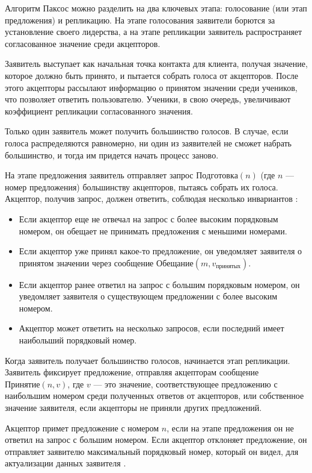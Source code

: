 Алгоритм Паксос можно разделить на два ключевых этапа: голосование (или этап
предложения) и репликацию. На этапе голосования заявители борются за установление
своего лидерства, а на этапе репликации заявитель распространяет согласованное
значение среди акцепторов.

Заявитель выступает как начальная точка контакта для клиента, получая значение,
которое должно быть принято, и пытается собрать голоса от акцепторов. После
этого акцепторы рассылают информацию о принятом значении среди учеников, что
позволяет ответить пользователю. Ученики, в свою очередь, увеличивают
коэффициент репликации согласованного значения.

Только один заявитель может получить большинство голосов. В случае, если
голоса распределяются равномерно, ни один из заявителей не сможет набрать
большинство, и тогда им придется начать процесс заново.

На этапе предложения заявитель отправляет запрос $Подготовка(n)$ (где $n$ —
номер предложения) большинству акцепторов, пытаясь собрать их голоса. Акцептор,
получив запрос, должен ответить, соблюдая несколько инвариантов \cite{lamport01}:

\begin{itemize}
    \item Если акцептор еще не отвечал на запрос с более высоким порядковым
        номером, он обещает не принимать предложения с меньшими номерами.
    \item Если акцептор уже принял какое-то предложение, он уведомляет
        заявителя о принятом значении через сообщение $Обещание(m, v_{\text{принятых}})$.
    \item Если акцептор ранее ответил на запрос с большим порядковым номером, он
        уведомляет заявителя о существующем предложении с более высоким номером.
    \item Акцептор может ответить на несколько запросов, если последний имеет
        наибольший порядковый номер.
\end{itemize}

Когда заявитель получает большинство голосов, начинается этап репликации.
Заявитель фиксирует предложение, отправляя акцепторам сообщение $Принятие(n, v)$,
где $v$ — это значение, соответствующее предложению с наибольшим номером среди
полученных ответов от акцепторов, или собственное значение заявителя, если
акцепторы не приняли других предложений.

Акцептор примет предложение с номером $n$, если на этапе предложения он не
ответил на запрос с большим номером. Если акцептор отклоняет предложение, он
отправляет заявителю максимальный порядковый номер, который он видел, для
актуализации данных заявителя \cite{lamport01}.

